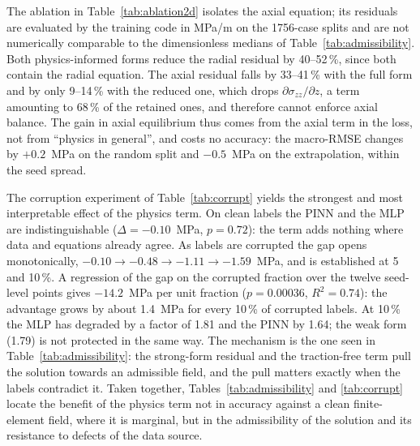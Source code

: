 \documentclass[subscriptcorrection,upint,varvw,barcolor=Goldenrod3,mathalfa=cal=euler,balance,hyphenate,french,pdf-a]{asmejour} %
\begin{document}
The ablation in Table~\ref{tab:ablation2d} isolates the axial equation; its residuals are evaluated by the training code in MPa/m on the 1756-case splits and are not numerically comparable to the dimensionless medians of Table~\ref{tab:admissibility}. %
Both physics-informed forms reduce the radial residual by 40--52\,\%, since both contain the radial equation. The axial residual falls by 33--41\,\% with the full form and by only 9--14\,\% with the reduced one, which drops $\partial\sigma_{zz}/\partial z$, a term amounting to 68\,\% of the retained ones, and therefore cannot enforce axial balance. The gain in axial equilibrium thus comes from the axial term in the loss, not from ``physics in general'', and costs no accuracy: the macro-RMSE changes by $+0.2$~MPa on the random split and $-0.5$~MPa on the extrapolation, within the seed spread.


The corruption experiment of Table~\ref{tab:corrupt} yields the strongest and most interpretable effect of the physics term. On clean labels the PINN and the MLP are indistinguishable ($\Delta=-0.10$~MPa, $p=0.72$): the term adds nothing where data and equations already agree. As labels are corrupted the gap opens monotonically, $-0.10\to-0.48\to-1.11\to-1.59$~MPa, and is established at 5 and 10\,\%. A regression of the gap on the corrupted fraction over the twelve seed-level points gives $-14.2$~MPa per unit fraction ($p=0.00036$, $R^2=0.74$): the advantage grows by about 1.4~MPa for every 10\,\% of corrupted labels. At 10\,\% the MLP has degraded by a factor of 1.81 and the PINN by 1.64; the weak form (1.79) is not protected in the same way. The mechanism is the one seen in Table~\ref{tab:admissibility}: the strong-form residual and the traction-free term pull the solution towards an admissible field, and the pull matters exactly when the labels contradict it. Taken together, Tables~\ref{tab:admissibility} and \ref{tab:corrupt} locate the benefit of the physics term not in accuracy against a clean finite-element field, where it is marginal, but in the admissibility of the solution and its resistance to defects of the data source.
\end{document}
